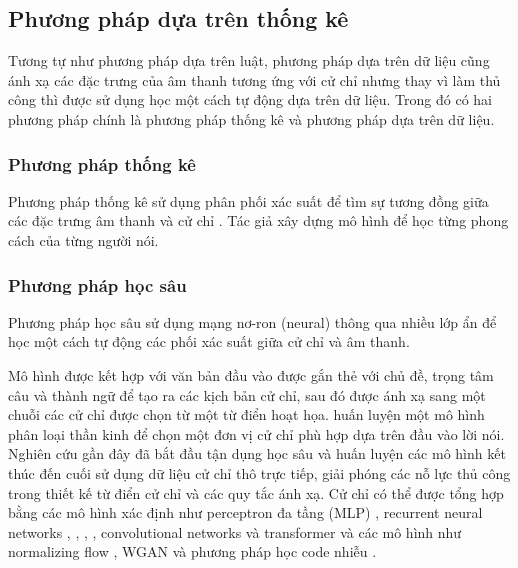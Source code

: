 \subsection{Phương pháp dựa trên thống kê}

Tương tự như phương pháp dựa trên luật, phương pháp dựa trên dữ liệu cũng ánh xạ các đặc trưng của âm thanh tương ứng với cử chỉ nhưng thay vì làm thủ công thì được sử dụng học một cách tự động dựa trên dữ liệu.
Trong đó có hai phương pháp chính là phương pháp thống kê và phương pháp dựa trên dữ liệu.


\subsubsection{Phương pháp thống kê}

Phương pháp thống kê sử dụng phân phối xác suất để tìm sự tương đồng giữa các đặc trưng âm thanh và cử chỉ \cite{levine2010gesture}. Tác giả \cite{neff2008gesture} xây dựng mô hình để học từng phong cách của từng người nói.

\subsubsection{Phương pháp học sâu}

Phương pháp học sâu sử dụng mạng nơ-ron (neural) thông qua nhiều lớp ẩn để học một cách tự động các phối xác suất giữa cử chỉ và âm thanh.

Mô hình được kết hợp với văn bản đầu vào được gắn thẻ với chủ đề, trọng tâm câu và thành ngữ để tạo ra các kịch bản cử chỉ, sau đó được ánh xạ sang một chuỗi các cử chỉ được chọn từ một từ điển hoạt họa. \cite{chiu2015predicting} huấn luyện một mô hình phân loại thần kinh để chọn một đơn vị cử chỉ phù hợp dựa trên đầu vào lời nói. Nghiên cứu gần đây đã bắt đầu tận dụng học sâu và huấn luyện các mô hình kết thúc đến cuối sử dụng dữ liệu cử chỉ thô trực tiếp, giải phóng các nỗ lực thủ công trong thiết kế từ điển cử chỉ và các quy tắc ánh xạ. Cử chỉ có thể được tổng hợp bằng các mô hình xác định như perceptron đa tầng (MLP) \cite{kucherenko2020gesticulator}, recurrent neural networks \cite{bhattacharya2021speech2affectivegestures}, \cite{liu2022learning}, \cite{hasegawa2018evaluation}, \cite{yoon2020speech}, convolutional networks \cite{habibie2021learning} và transformer \cite{bhattacharya2021text2gestures} và các mô hình như normalizing flow \cite{alexanderson2020style}, WGAN \cite{wu2021probabilistic} và phương pháp học code nhiễu \cite{xu2022freeform}.

